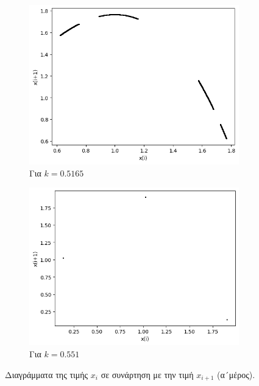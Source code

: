\begin{figure}[ht]
\begin{subfigure}[b]{0.4\textwidth}
		\includegraphics[width=\textwidth]{LateX images/graphs q03/g67}
		\caption{Για $k=0.5165$}
		\label{f:k19}
	\end{subfigure}
	\hfill
	\begin{subfigure}[b]{0.4\textwidth}
		\centering
		\includegraphics[width=\textwidth]{LateX images/graphs q03/g8}
		\caption{Για $k=0.551$}
		\label{f:k20}
	\end{subfigure}
	\hfill
	\caption{Διαγράμματα της τιμής \(x_i\) σε συνάρτηση με την τιμή \(x_{i+1}\) (α´μέρος).}	
\end{figure}
